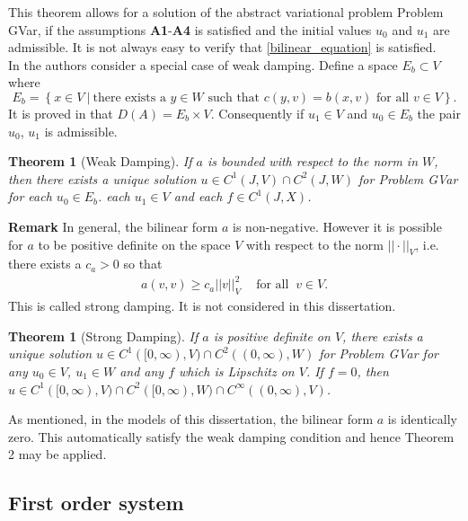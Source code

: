 \documentclass[../../main.tex]{subfiles}
\begin{document}
This theorem allows for a solution of the abstract variational problem Problem GVar, if the assumptions \textbf{A1}-\textbf{A4} is satisfied and the initial values $u_0$ and $u_1$ are admissible. It is not always easy to verify that \eqref{bilinear_equation} is satisfied.\\


In \cite{VV02} the authors consider a special case of weak damping. Define a space $E_b \subset V$ where \[ E_b = \left\{x \in V \ | \ \textrm{there exists a } y \in W \textrm{ such that } c(y,v) = b(x,v) \textrm{ for all } v \in V\right\}.\] It is proved in \cite{VV02}  that $D(A) = E_b \times V$. Consequently if $u_1 \in V$ and $u_0 \in E_b$ the pair $u_0$, $u_1$ is admissible.


\newtheorem{Thm2n}[Thmx]{Theorem}
\begin{Thm2n}[Weak Damping]
	If $a$ is bounded with respect to the norm in $W$, then there exists a unique solution $u\in C^1(J,V)\cap C^2(J,W)$ for Problem GVar for each $u_0 \in E_b$. each $u_1 \in V$ and each $f\in C^1(J,X)$.
\end{Thm2n}

\textbf{Remark} In general, the bilinear form $a$ is non-negative. However it is possible for $a$ to be positive definite on the space $V$ with respect to the norm $||\cdot||_V$, i.e. there exists a $c_a > 0$ so that
\begin{eqnarray*}
	a(v,v) \geq c_a ||v||^2_V \ \ \ \ \textrm{ for all } \ v \in V.
\end{eqnarray*} This is called strong damping. It is not considered in this dissertation.

\newtheorem{Thm3n}[Thmx]{Theorem}
\begin{Thm3n}[Strong Damping]
	If $a$ is positive definite on $V$, there exists a unique solution $u \in C^1([0,\infty),V)\cap C^2((0,\infty),W)$ for Problem GVar for any $u_0 \in V$, $u_1 \in W$ and any $f$ which is Lipschitz on $V$. If $f=0$, then $u \in C^1([0,\infty),V)\cap C^2([0,\infty),W)\cap C^\infty((0,\infty),V)$.
\end{Thm3n}

As mentioned, in the models of this dissertation, the bilinear form $a$ is identically zero. This automatically satisfy the weak damping condition and hence Theorem 2 may be applied.


\subsection{First order system} \label{ssec:existence:AbstractDifferentialEquation}
\end{document}

